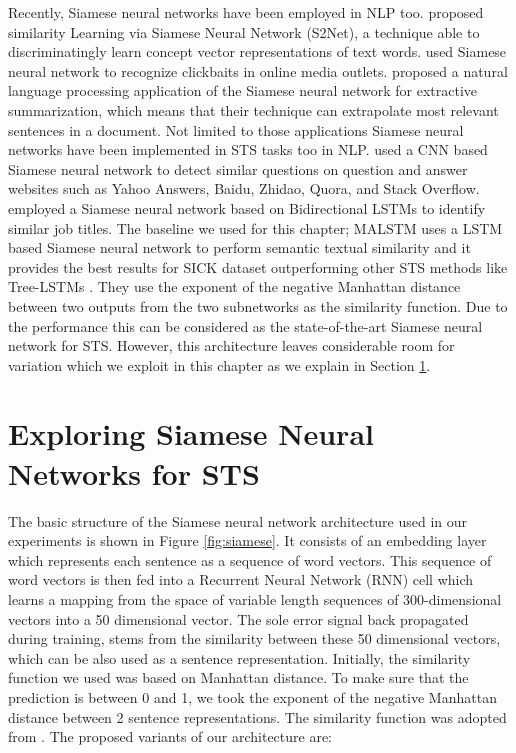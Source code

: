 Recently, Siamese neural networks have been employed in NLP too. \citet{10.5555/2018936.2018965} proposed similarity Learning via Siamese Neural Network (S2Net), a technique able to discriminatingly learn concept vector representations of text words. \citet{10.1145/3209978.3210144} used Siamese neural network to recognize clickbaits in online media outlets. \citet{Gonzalez2019} proposed a natural language processing application of the Siamese neural network for extractive summarization, which means that their technique can extrapolate most relevant sentences in a document. Not limited to those applications Siamese neural networks have been implemented in STS tasks too in NLP. \citet{das-etal-2016-together} used a CNN based Siamese neural network to detect similar questions on question and answer websites such as Yahoo Answers, Baidu, Zhidao, Quora, and Stack Overflow. \citet{neculoiu-etal-2016-learning} employed a Siamese neural network based on Bidirectional LSTMs to identify similar job titles. The baseline we used for this chapter; MALSTM \cite{Mueller_Thyagarajan_2016} uses a LSTM based Siamese neural network to perform semantic textual similarity and it provides the best results for SICK dataset outperforming other STS methods like Tree-LSTMs \cite{tai-etal-2015-improved}. They use the exponent of the negative Manhattan distance between two outputs from the two subnetworks as the similarity function. Due to the performance this can be considered as the state-of-the-art Siamese neural network for STS. However, this architecture leaves considerable room for variation which we exploit in this chapter as we explain in Section \ref{sec:siamese_method}.



\section{Exploring Siamese Neural Networks for STS}
\label{sec:siamese_method}

The basic structure of the Siamese neural network architecture used in our experiments is shown in Figure \ref{fig:siamese}. It consists of an embedding layer which represents each sentence as a sequence of word vectors. This sequence of word vectors is then fed into a Recurrent Neural Network (RNN) cell which learns a mapping from the space of variable length sequences of 300-dimensional vectors into a 50 dimensional vector. The sole error signal back propagated during training, stems from the similarity between these 50 dimensional vectors, which can be also used as a sentence representation. Initially, the similarity function we used was based on Manhattan distance. To make sure that the prediction is between 0 and 1, we took the exponent of the negative Manhattan distance between 2 sentence representations. The similarity function was adopted from \citet{Mueller_Thyagarajan_2016}. The proposed variants of our architecture are:


